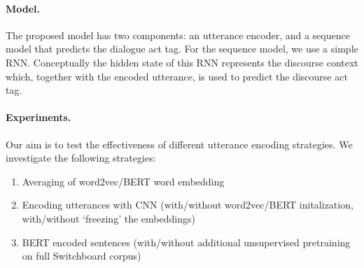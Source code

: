 \documentclass[11pt,a4paper,headings=standardclasses]{article}
\begin{document}
%

\paragraph{Model.}
The proposed model has two components: an utterance encoder, and a sequence model that predicts the dialogue act tag.
For the sequence model, we use a simple RNN.
Conceptually the hidden state of this RNN represents the discourse context which, 
together with the encoded utterance, is used to predict the discourse act tag.



\paragraph{Experiments.}
Our aim is to test the effectiveness of different utterance encoding strategies. We investigate the following strategies:
\begin{enumerate}
  \item Averaging of word2vec/BERT word embedding
  \item Encoding utterances with CNN (with/without word2vec/BERT initalization, with/without `freezing' the embeddings)
  \item BERT encoded sentences (with/without additional unsupervised pretraining on full Switchboard corpus)
  \end{enumerate}
\end{document}

